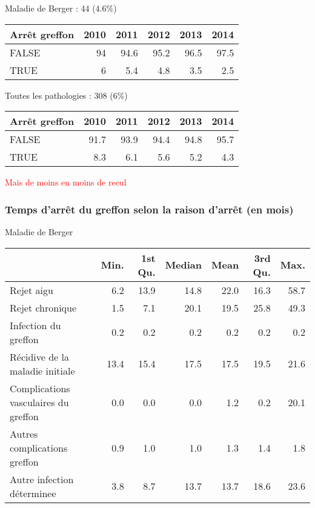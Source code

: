 \documentclass[11pt,a4paper]{article}\usepackage[]{graphicx}\usepackage[]{color}
\begin{document}
Maladie de Berger : 44 (4.6\%)

\begin{table}[H]
\centering
\begin{tabular}{lrrrrr}
  \hline
Arrêt greffon & 2010 & 2011 & 2012 & 2013 & 2014 \\ 
  \hline
FALSE & 94 & 94.6 & 95.2 & 96.5 & 97.5 \\ 
  TRUE & 6 & 5.4 & 4.8 & 3.5 & 2.5 \\ 
   \hline
\end{tabular}
\end{table}


Toutes les pathologies : 308 (6\%)

\begin{table}[H]
\centering
\begin{tabular}{lrrrrr}
  \hline
Arrêt greffon & 2010 & 2011 & 2012 & 2013 & 2014 \\ 
  \hline
FALSE & 91.7 & 93.9 & 94.4 & 94.8 & 95.7 \\ 
  TRUE & 8.3 & 6.1 & 5.6 & 5.2 & 4.3 \\ 
   \hline
\end{tabular}
\end{table}


\textcolor{red}{Mais de moins en moins de recul}

    \subsubsection{Temps d'arrêt du greffon selon la raison d'arrêt (en mois)}

Maladie de Berger

\begin{table}[H]
\centering
\begin{tabular}{lrrrrrr}
  \hline
 & Min. & 1st Qu. & Median & Mean & 3rd Qu. & Max. \\ 
  \hline
Rejet aigu & 6.2 & 13.9 & 14.8 & 22.0 & 16.3 & 58.7 \\ 
  Rejet chronique & 1.5 & 7.1 & 20.1 & 19.5 & 25.8 & 49.3 \\ 
  Infection du greffon & 0.2 & 0.2 & 0.2 & 0.2 & 0.2 & 0.2 \\ 
  Récidive de la maladie initiale & 13.4 & 15.4 & 17.5 & 17.5 & 19.5 & 21.6 \\ 
  Complications vasculaires du greffon & 0.0 & 0.0 & 0.0 & 1.2 & 0.2 & 20.1 \\ 
  Autres complications greffon & 0.9 & 1.0 & 1.0 & 1.3 & 1.4 & 1.8 \\ 
  Autre infection déterminee & 3.8 & 8.7 & 13.7 & 13.7 & 18.6 & 23.6 \\ 
   \hline
\end{tabular}
\end{table}
\end{document}
